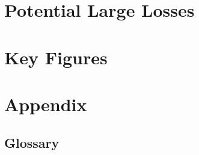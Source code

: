 \documentclass[a4paper,12pt]{article}
\begin{document}
\begin{small}
    
\end{small}

\section{Potential Large Losses}
\label{sec:potential-large-losses}

\begin{small}
    
\end{small}


\section{Key Figures} 
\label{sec:key-figures}



\section{Appendix}
\label{sec:appendix}

\subsection{Glossary}
\label{subsec:glossary}


\end{document}
